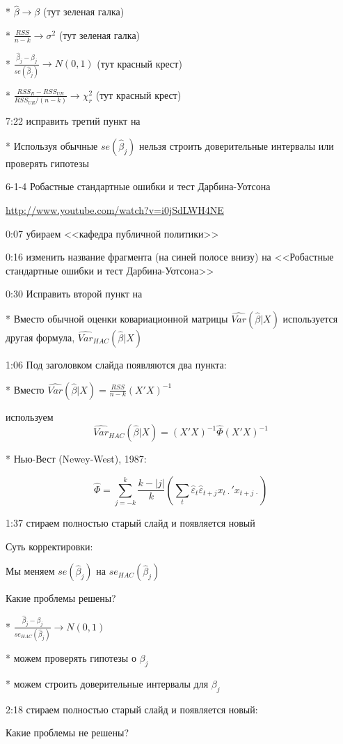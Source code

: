 \documentclass[12pt,a4paper]{article}
\newcommand{\e}{\varepsilon}
\renewcommand{\b}{\beta}
\newcommand{\hb}{\hat{\b}}
\begin{document}
* $\hb \to \beta$ (тут зеленая галка)

* $\frac{RSS}{n-k} \to \sigma^2$ (тут зеленая галка)

* $\frac{\hat{\beta}_j-\beta_j}{se(\hat{\beta}_j)} \to N(0,1)$ (тут красный крест)

* $\frac{RSS_R-RSS_{UR}}{RSS_{UR}/(n-k)} \to \chi^2_r$ (тут красный крест)

7:22 исправить третий пункт на 

* Используя обычные $se(\hb_j)$ нельзя строить доверительные интервалы или проверять гипотезы


6-1-4 Робастные стандартные ошибки и тест Дарбина-Уотсона

\url{http://www.youtube.com/watch?v=i0jSdLWH4NE}

0:07 убираем <<кафедра публичной политики>>

0:16 изменить название фрагмента (на синей полосе внизу) на <<Робастные стандартные ошибки и тест Дарбина-Уотсона>>

0:30 Исправить второй пункт на 

* Вместо обычной оценки ковариационной матрицы $\widehat{Var}(\hb|X)$ используется  другая формула, $\widehat{Var}_{HAC}(\hb|X)$ 

1:06 Под заголовком слайда появляются два пункта:

* Вместо $\widehat{Var}(\hat{\beta}|X)=\frac{RSS}{n-k}(X'X)^{-1}$ 

используем
\[
\widehat{Var}_{HAC}(\hat{\beta}|X)=(X'X)^{-1}\hat{\Phi}(X'X)^{-1}
\]

* Нью-Вест (Newey-West), 1987:

\[
\hat{\Phi} = \sum_{j=-k}^k \frac{k-|j|}{k} \left(  \sum_t \hat{\e}_t\hat{\e}_{t+j} x_{t\,\cdot}'x_{t+j\,\cdot} \right)
\]

1:37 стираем полностью старый слайд и появляется новый 

Суть корректировки:

Мы меняем $se(\hat{\beta}_j)$ на $se_{HAC}(\hat{\beta}_j)$

Какие проблемы решены?

* $\frac{\hat{\beta}_j-\beta_j}{se_{HAC}(\hat{\beta}_j)} \to N(0,1)$ 

* можем проверять гипотезы о $\beta_j$

* можем строить доверительные интервалы для $\beta_j$

2:18 стираем полностью старый слайд и появляется новый:

Какие проблемы не решены?
\end{document}
